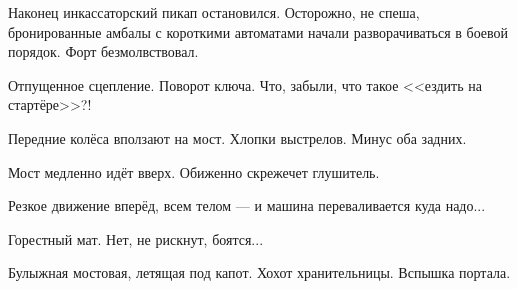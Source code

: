 \emptypar

Наконец инкассаторский пикап остановился.
Осторожно, не спеша, бронированные амбалы с короткими автоматами начали разворачиваться в боевой порядок.
Форт безмолвствовал.

\emptypar

Отпущенное сцепление. Поворот ключа. Что, забыли, что такое <<ездить на стартёре>>?!

\emptypar

Передние колёса вползают на мост. Хлопки выстрелов. Минус оба задних.

\emptypar

Мост медленно идёт вверх. Обиженно скрежечет глушитель.

\emptypar

Резкое движение вперёд, всем телом --- и машина переваливается куда надо...

\emptypar

Горестный мат. Нет, не рискнут, боятся...

\emptypar

Булыжная мостовая, летящая под капот. Хохот хранительницы. Вспышка портала.

\emptypar

\emptypar

